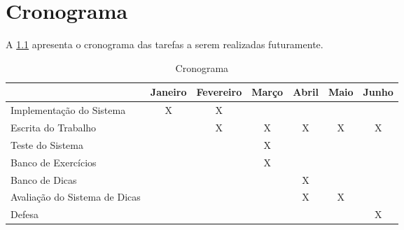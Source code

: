 \chapter{Cronograma}

A \cref{tabela:cronograma} apresenta o cronograma das tarefas a serem realizadas futuramente.

\begin{table}[]
	\captionsetup{justification=centering}
	\caption{Cronograma}
	\label{tabela:cronograma}
	\begin{tabular}{|l|c|c|c|c|c|c|}
		\hline
		& Janeiro & Fevereiro & Março & Abril & Maio & Junho \\ \hline
		Implementação do Sistema 		& X       & X         &       &       &      &       \\ \hline
		Escrita do Trabalho      		&         & X         & X     & X     & X    & X     \\ \hline
		Teste do Sistema         		&         &           & X     &       &      &       \\ \hline
		Banco de Exercícios      		&         &           & X     &       &      &       \\ \hline
		Banco de Dicas           		&         &           &       & X     &      &       \\ \hline
		Avaliação do Sistema de Dicas   &         &           &       & X     & X    &       \\ \hline
		Defesa                     		&         &           &       &       &      & X     \\ \hline
	\end{tabular}
\end{table}